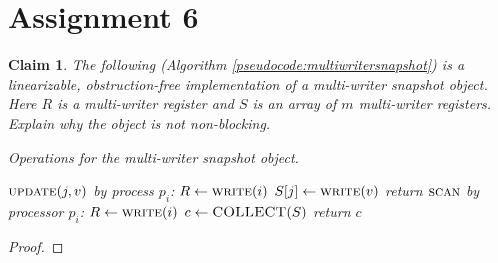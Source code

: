\documentclass[11pt]{article}
\newcommand\writeF{\textsc{write}}
\newcommand\updateF{\textsc{update}}
\newcommand\scanF{\textsc{scan}}
\newcommand\COLLECT{\textsc{COLLECT}}
\newcommand\READ{\textsc{READ}}
\newtheorem{claim}[theorem]{Claim}
\begin{document}
\rhead{\today}

\section*{Assignment 6}
\begin{claim}
The following (Algorithm \ref{pseudocode:multiwritersnapshot}) is a linearizable, obstruction-free implementation of a multi-writer snapshot object. Here $R$ is a multi-writer register and $S$ is an array of $m$ multi-writer registers. Explain why the object is not non-blocking.

\begin{algorithm}
	\caption{Operations for the multi-writer snapshot object.}
    \label{pseudocode:multiwritersnapshot}
    \begin{algorithmic}[1]
	\State $\updateF(j, v)$ by process $p_i$:
	\State $R \leftarrow \writeF(i)$
	\State $S[j] \leftarrow \writeF(v)$
	\State return
	\State
	\State $\scanF$ by processor $p_i$:
	\Do 
		\State $R \leftarrow \writeF(i)$
		\State $c \leftarrow \COLLECT(S)$
	\doWhile{$\READ(R) = i$}
	\State return $c$
    \end{algorithmic}
\end{algorithm}
\end{claim}
\begin{proof}

\end{proof}
\end{document}
